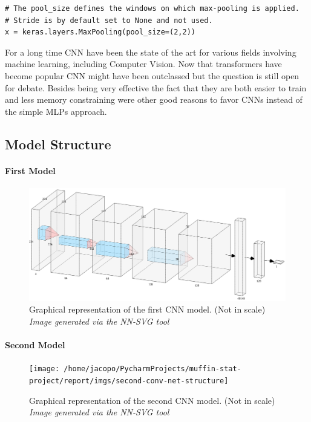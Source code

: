 \begin{verbatim}
# The pool_size defines the windows on which max-pooling is applied.
# Stride is by default set to None and not used.
x = keras.layers.MaxPooling(pool_size=(2,2))
\end{verbatim}




For a long time CNN have been the state of the art for various fields involving machine learning, including Computer Vision.
Now that transformers have become popular CNN might have been outclassed but the question is still open for debate.\cite{wang2023cnns}
Besides being very effective the fact that they are both easier to train and less memory constraining were other good reasons
to favor CNNs instead of the simple MLPs approach.

\subsection{Model Structure}
\paragraph{First Model}

\begin{figure}[h]
    \centering
    \includegraphics[scale=0.15]{imgs/custom-cnn-one}
    \caption{
        Graphical representation of the first CNN model. (Not in scale)\\
        \textit{Image generated via the NN-SVG tool}
    }\label{fig:custom_cnn}
\end{figure}



\paragraph{Second Model}

\begin{figure}
    \centering
    \texttt{[image: /home/jacopo/PycharmProjects/muffin-stat-project/report/imgs/second-conv-net-structure]}
    \caption{
        Graphical representation of the second CNN model. (Not in scale)\\
        \textit{Image generated via the NN-SVG tool}
    }
    \label{fig:second-conv-net-structure}
\end{figure}


